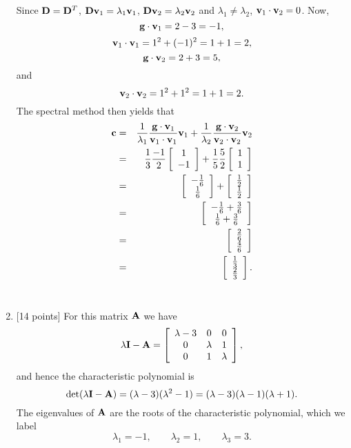 \begin{solution}
\begin{enumerate}
Since ${\bf D}={\bf D}^T$, ${\bf D}{\bf v}_1=\lambda_1{\bf v}_1$, ${\bf D}{\bf v}_2=\lambda_2{\bf v}_2$ and $\lambda_1\ne\lambda_2$, ${\bf v}_1\cdot{\bf v}_2=0$. Now,
\[
{\bf g}\cdot{\bf v}_1=2-3=-1,
\]
\[
{\bf v}_1\cdot{\bf v}_1=1^2+(-1)^2=1+1=2,
\]
\[
{\bf g}\cdot{\bf v}_2=2+3=5,
\]
and
\[
{\bf v}_2\cdot{\bf v}_2=1^2+1^2=1+1=2.
\]
The spectral method then yields that
\begin{eqnarray*}
{\bf c}&=&{1\over\lambda_1}{{\bf g}\cdot{\bf v}_1\over{\bf v}_1\cdot{\bf v}_1}{\bf v}_1+{1\over\lambda_2}{{\bf g}\cdot{\bf v}_2\over{\bf v}_2\cdot{\bf v}_2}{\bf v}_2
\\
&=&{1\over3}{-1\over2}\left[\begin{array}{c}1 \\ -1\end{array}\right]+{1\over5}{5\over2}\left[\begin{array}{c}1 \\ 1\end{array}\right]
\\
&=&\left[\begin{array}{c}-{1\over6} \\ {1\over6}\end{array}\right]+\left[\begin{array}{c}{1\over2} \\ {1\over2}\end{array}\right]
\\
&=&\left[\begin{array}{c}-{1\over6}+{3\over6} \\ {1\over6}+{3\over6}\end{array}\right]
\\
&=&\left[\begin{array}{c}{2\over6} \\ {4\over6}\end{array}\right]
\\
&=&\left[\begin{array}{c}{1\over3} \\ {2\over3}\end{array}\right].
\end{eqnarray*}
\\
\item {[14 points]} For this matrix ${\bf A}$ we have
\[ \lambda{\bf I} - {\bf A} = \left[\begin{array}{ccc}\lambda-3 & 0 & 0 \\ 0 & \lambda & 1 \\ 0 & 1 & \lambda\end{array}\right],\]
and hence the characteristic polynomial is 
\[ \det(\lambda{\bf I} - {\bf A}) = (\lambda-3)(\lambda^2 - 1) = (\lambda-3)(\lambda-1)(\lambda+1).\]
The eigenvalues of ${\bf A}$ are the roots of the characteristic polynomial, which we label
\[ \lambda_1 = -1, \qquad
   \lambda_2 = 1, \qquad
   \lambda_3 = 3.\]


\end{enumerate}
\end{solution}
